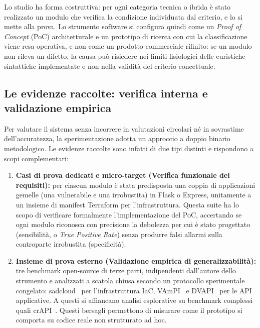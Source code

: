 Lo studio ha forma costruttiva: per ogni categoria tecnica o ibrida è stato
realizzato un modulo che verifica la condizione individuata dal criterio, e lo
si mette alla prova. Lo strumento software si configura quindi come un \emph{Proof of Concept} (PoC)
architetturale e un prototipo di ricerca con cui la classificazione viene resa
operativa, e non come un prodotto commerciale rifinito: se un modulo non rileva
un difetto, la causa può risiedere nei limiti fisiologici delle euristiche
sintattiche implementate e non nella validità del criterio concettuale.

\subsection{Le evidenze raccolte: verifica interna e validazione empirica}
\label{sec:ris-evidenze}

Per valutare il sistema senza incorrere in valutazioni circolari né in sovrastime dell'accuratezza,
la sperimentazione adotta un approccio a doppio binario metodologico. Le evidenze raccolte
sono infatti di due tipi distinti e rispondono a scopi complementari:
\begin{enumerate}
  \item \textbf{Casi di prova dedicati e micro-target (Verifica funzionale dei requisiti):}
    per ciascun modulo è stata predisposta una coppia di applicazioni gemelle (una vulnerabile
    e una irrobustita) in Flask o Express, unitamente a un insieme di manifest Terraform per
    l'infrastruttura. Questa suite ha lo scopo di verificare formalmente l'implementazione del PoC,
    accertando se ogni modulo riconosca con precisione la debolezza per cui è stato progettato (sensibilità,
    o \emph{True Positive Rate}) senza produrre falsi allarmi sulla controparte irrobustita (specificità).
  \item \textbf{Insieme di prova esterno (Validazione empirica di generalizzabilità):}
    tre benchmark open-source di terze parti, indipendenti dall'autore dello strumento e analizzati
    a scatola chiusa secondo un protocollo sperimentale congelato: sadcloud~\cite{nccgroup2021sadcloud}
    per l'infrastruttura IaC, VAmPI~\cite{erev0s2026vampi} e DVAPI~\cite{payatu2025dvapi} per le API applicative.
    A questi si affiancano analisi esplorative su benchmark complessi quali crAPI~\cite{owasp2026crapi}.
    Questi bersagli permettono di misurare come il prototipo si comporta su codice reale non strutturato ad hoc.
\end{enumerate}

